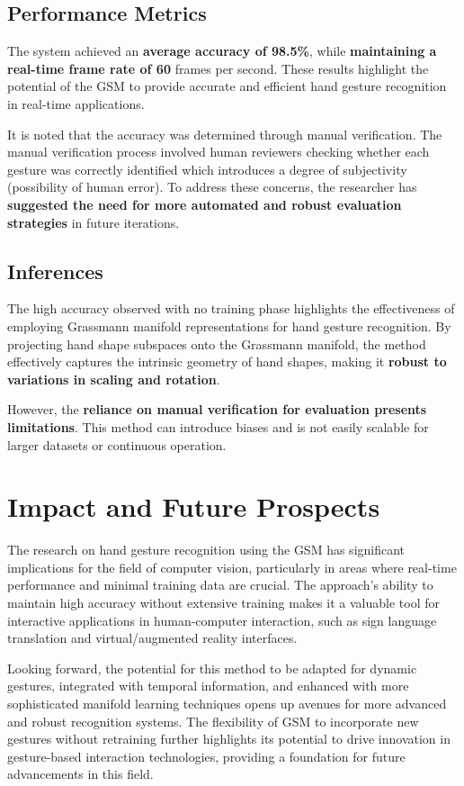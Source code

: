 \documentclass[12pt,a4paper]{article}
\begin{document}
\subsection{Performance Metrics}
The system achieved an \textbf{average accuracy of 98.5\%}, while \textbf{maintaining a real-time frame rate of 60} frames per second. These results highlight the potential of the GSM to provide accurate and efficient hand gesture recognition in real-time applications.

It is noted that the accuracy was determined through manual verification. The manual verification process involved human reviewers checking whether each gesture was correctly identified which introduces a degree of subjectivity (possibility of human error). To address these concerns, the researcher has \textbf{suggested the need for more automated and robust evaluation strategies} in future iterations.

\subsection{Inferences}
The high accuracy observed with no training phase highlights the effectiveness of employing Grassmann manifold representations for hand gesture recognition. By projecting hand shape subspaces onto the Grassmann manifold, the method effectively captures the intrinsic geometry of hand shapes, making it \textbf{robust to variations in scaling and rotation}.

However, the \textbf{reliance on manual verification for evaluation presents limitations}. This method can introduce biases and is not easily scalable for larger datasets or continuous operation.

\section{Impact and Future Prospects}

The research on hand gesture recognition using the GSM has significant implications for the field of computer vision, particularly in areas where real-time performance and minimal training data are crucial. The approach's ability to maintain high accuracy without extensive training makes it a valuable tool for interactive applications in human-computer interaction, such as sign language translation and virtual/augmented reality interfaces.

Looking forward, the potential for this method to be adapted for dynamic gestures, integrated with temporal information, and enhanced with more sophisticated manifold learning techniques opens up avenues for more advanced and robust recognition systems. The flexibility of GSM to incorporate new gestures without retraining further highlights its potential to drive innovation in gesture-based interaction technologies, providing a foundation for future advancements in this field.
\end{document}
